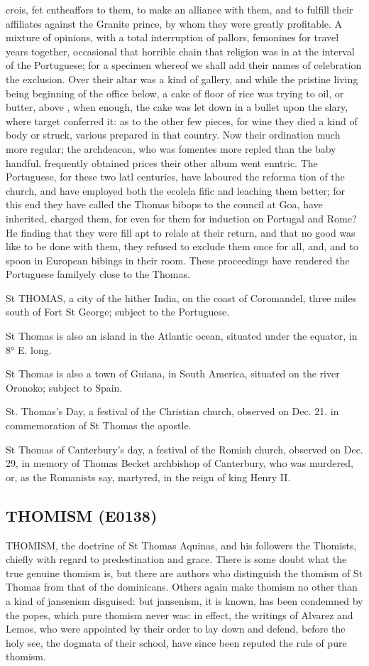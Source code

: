 \documentclass{article}
\begin{document}
crois, fet entheaffors to them, to make an alliance with them, and to fulfill their affiliates against the Granite prince, by whom they were greatly profitable. A mixture of opinions, with a total interruption of pallors, femonines for travel years together, occasional that horrible chain that religion was in at the interval of the Portuguese; for a specimen whereof we shall add their names of celebration the exclusion. Over their altar was a kind of gallery, and while the pristine living being beginning of the office below, a cake of floor of rice was trying to oil, or butter, above , when enough, the cake was let down in a bullet upon the slary, where target conferred it: as to the other few pieces, for wine they died a kind of body or struck, various prepared in that country. Now their ordination much more regular; the archdeacon, who was fomentes more repled than the baby handful, frequently obtained prices their other album went enntric. The Portuguese, for these two latl centuries, have laboured the reforma tion of the church, and have employed both the ecolela fific and leaching them better; for this end they have called the Thomas bibops to the council at Goa, have inherited, charged them, for even for them for induction on Portugal and Rome? He finding that they were fill apt to relale at their return, and that no good was like to be done with them, they refused to exclude them once for all, and, and to spoon in European bibings in their room. These proceedings have rendered the Portuguese familyely close to the Thomas.

St THOMAS, a city of the hither India, on the coast of Coromandel, three miles south of Fort St George; subject to the Portuguese.

St Thomas is also an island in the Atlantic ocean, situated under the equator, in 8° E. long.

St Thomas is also a town of Guiana, in South America, situated on the river Oronoko; subject to Spain.

St. Thomas's Day, a festival of the Christian church, observed on Dec. 21. in commemoration of St Thomas the apostle.

St Thomas of Canterbury's day, a festival of the Romish church, observed on Dec. 29, in memory of Thomas Becket archbishop of Canterbury, who was murdered, or, as the Romanists say, martyred, in the reign of king Henry II.

\subsection*{THOMISM (E0138)}
THOMISM, the doctrine of St Thomas Aquinas, and his followers the Thomists, chiefly with regard to predestination and grace. There is some doubt what the true genuine thomism is, but there are authors who distinguish the thomism of St Thomas from that of the dominicans. Others again make thomism no other than a kind of jansenism disguised: but jansenism, it is known, has been condemned by the popes, which pure thomism never was: in effect, the writings of Alvarez and Lemos, who were appointed by their order to lay down and defend, before the holy see, the dogmata of their school, have since been reputed the rule of pure thomism.
\end{document}
